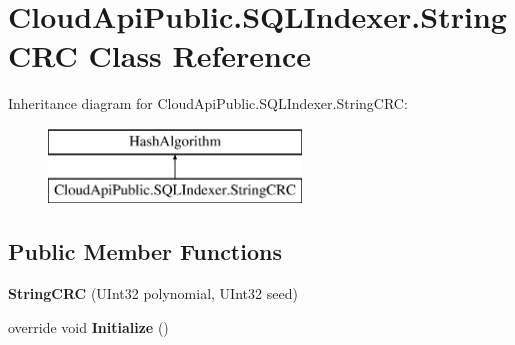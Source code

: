 \hypertarget{class_cloud_api_public_1_1_s_q_l_indexer_1_1_string_c_r_c}{\section{Cloud\-Api\-Public.\-S\-Q\-L\-Indexer.\-String\-C\-R\-C Class Reference}
\label{class_cloud_api_public_1_1_s_q_l_indexer_1_1_string_c_r_c}
}
Inheritance diagram for Cloud\-Api\-Public.\-S\-Q\-L\-Indexer.\-String\-C\-R\-C\-:\begin{figure}[H]
\begin{center}
\leavevmode
\includegraphics[height=2.000000cm]{class_cloud_api_public_1_1_s_q_l_indexer_1_1_string_c_r_c}
\end{center}
\end{figure}
\subsection*{Public Member Functions}
\begin{DoxyCompactItemize}
\item 
\hypertarget{class_cloud_api_public_1_1_s_q_l_indexer_1_1_string_c_r_c_a4b6385252b2c13fdbb5d15f3829f7267}{{\bfseries String\-C\-R\-C} (U\-Int32 polynomial, U\-Int32 seed)}\label{class_cloud_api_public_1_1_s_q_l_indexer_1_1_string_c_r_c_a4b6385252b2c13fdbb5d15f3829f7267}

\item 
\hypertarget{class_cloud_api_public_1_1_s_q_l_indexer_1_1_string_c_r_c_ad5080f71cba8642e3f462161cba811d9}{override void {\bfseries Initialize} ()}\label{class_cloud_api_public_1_1_s_q_l_indexer_1_1_string_c_r_c_ad5080f71cba8642e3f462161cba811d9}

\end{DoxyCompactItemize}
